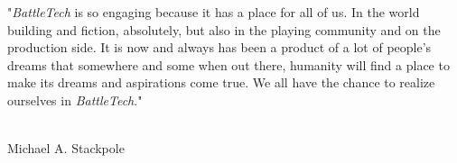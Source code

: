 \begin{center}
  \parbox{0.6\textwidth}{
    \begin{center}
      "\emph{BattleTech} is so engaging because it has a place for all of us.
      In the world building and fiction, absolutely, but also in the playing community and on the production side.
      It is now and always has been a product of a lot of people’s dreams that somewhere and some when out there, humanity will find a place to make its dreams and aspirations come true.
      We all have the chance to realize ourselves in \emph{BattleTech}."
    \end{center}
  }

  ~\\

  Michael A. Stackpole
\end{center}

